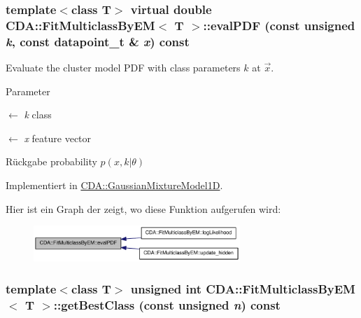 \hypertarget{classCDA_1_1FitMulticlassByEM_a5853c1889b12e567d2d9ab6c395dfe0d}{
\subsubsection[{evalPDF}]{\setlength{\rightskip}{0pt plus 5cm}template$<$class T$>$ virtual double {\bf CDA::FitMulticlassByEM}$<$ T $>$::evalPDF (const unsigned {\em k}, \/  const {\bf datapoint\_\-t} \& {\em x}) const}}
\label{classCDA_1_1FitMulticlassByEM_a5853c1889b12e567d2d9ab6c395dfe0d}


Evaluate the cluster model PDF with class parameters $k$ at $\vec{x}$. 


\begin{DoxyParams}{Parameter}
\item[\mbox{$\leftarrow$} {\em k}]class \item[\mbox{$\leftarrow$} {\em x}]feature vector\end{DoxyParams}
\begin{DoxyReturn}{Rückgabe}
probability $p(x,k\vert\theta)$ 
\end{DoxyReturn}


Implementiert in \hyperlink{classCDA_1_1GaussianMixtureModel1D_a0ee83653e92c833951631f300cfe338d}{CDA::GaussianMixtureModel1D}.



Hier ist ein Graph der zeigt, wo diese Funktion aufgerufen wird:\nopagebreak
\begin{figure}[H]
\begin{center}
\leavevmode
\includegraphics[width=221pt]{classCDA_1_1FitMulticlassByEM_a5853c1889b12e567d2d9ab6c395dfe0d_icgraph}
\end{center}
\end{figure}


\hypertarget{classCDA_1_1FitMulticlassByEM_a69d730c94245ec23b9a96cccee951129}{
\subsubsection[{getBestClass}]{\setlength{\rightskip}{0pt plus 5cm}template$<$class T$>$ unsigned int {\bf CDA::FitMulticlassByEM}$<$ T $>$::getBestClass (const unsigned {\em n}) const}}
\label{classCDA_1_1FitMulticlassByEM_a69d730c94245ec23b9a96cccee951129}


